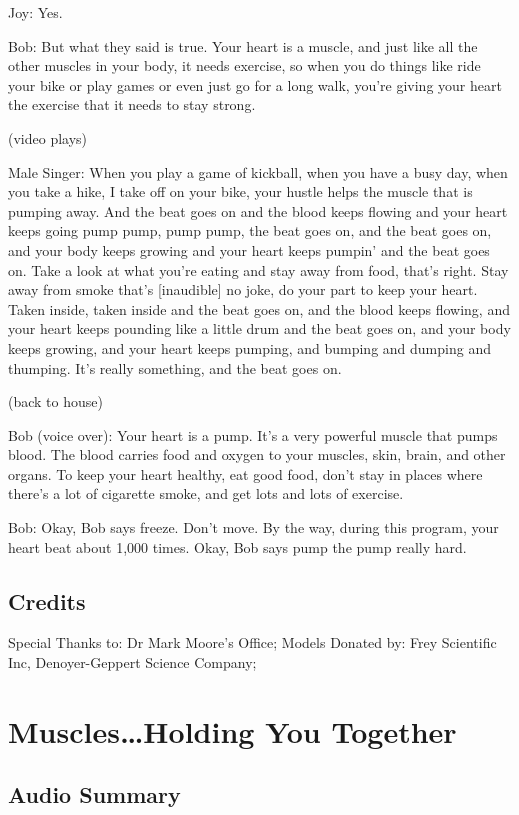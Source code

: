 Joy: Yes.

Bob: But what they said is true. Your heart is a muscle, and just like all the other muscles in your body, it needs exercise, so when you do things like ride your bike or play games or even just go for a long walk, you're giving your heart the exercise that it needs to stay strong.

(video plays)

Male Singer: When you play a game of kickball, when you have a busy day, when you take a hike, I take off on your bike, your hustle helps the muscle that is pumping away. And the beat goes on and the blood keeps flowing and your heart keeps going pump pump, pump pump, the beat goes on, and the beat goes on, and your body keeps growing and your heart keeps pumpin' and the beat goes on. Take a look at what you're eating and stay away from food, that's right. Stay away from smoke that's [inaudible] no joke, do your part to keep your heart. Taken inside, taken inside and the beat goes on, and the blood keeps flowing, and your heart keeps pounding like a little drum and the beat goes on, and your body keeps growing, and your heart keeps pumping, and bumping and dumping and thumping. It's really something, and the beat goes on.

(back to house)

Bob (voice over): Your heart is a pump. It's a very powerful muscle that pumps blood. The blood carries food and oxygen to your muscles, skin, brain, and other organs. To keep your heart healthy, eat good food, don't stay in places where there's a lot of cigarette smoke, and get lots and lots of exercise.

Bob: Okay, Bob says freeze. Don't move. By the way, during this program, your heart beat about 1,000 times. Okay, Bob says pump the pump really hard.

\subsection{Credits}

Special Thanks to: Dr Mark Moore's Office;
Models Donated by: Frey Scientific Inc, Denoyer-Geppert Science Company;

\section{Muscles\dots Holding You Together}

\subsection{Audio Summary}

